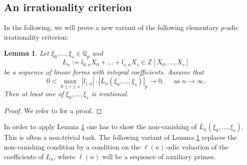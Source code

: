 \documentclass[12pt]{article}
\newtheorem{lemma}[theorem]{Lemma}
\numberwithin{equation}{section}
\begin{document}
\subsection{An irrationality criterion}
In the following, we will prove a new variant of the following elementary $p$-adic irrationality criterion:

\begin{lemma}\label{lem:irrationalityCrit_classical}
Let $\xi_0,\dots,\xi_s\in \mathbb{Q}_p$ and 
\[
	L_n:=l_{0,n}X_0+\dots + l_{s,n}X_s\in \mathbb{Z}[X_0,\dots, X_s] 
\]
be a sequence of linear forms with integral coefficients. Assume that
\[
    0<\max_{0\leqslant i\leqslant s}|l_{i,n}|\cdot |L_n(\xi_0,\dots,\xi_s)|_p\rightarrow 0, \quad \text{ as }n\to \infty.
\] 
Then at least one of $\xi_0,\dots,\xi_s$ is irrational. 
\end{lemma}
\begin{proof}
    We refer to \cite[Lemma 2.1]{Lai2023} for a proof.
\end{proof}

In order to apply Lemma \ref{lem:irrationalityCrit_classical} one has to show the non-vanishing of $L_n(\xi_0,\dots,\xi_s)$. This is often a non-trivial task. The following variant of Lemma \ref{lem:irrationalityCrit_classical} replaces the non-vanishing condition by a condition on the $\ell(n)$-adic valuation of the coefficients of $L_n$, where $\ell(n)$  will be a sequence of auxiliary primes.
\end{document}
